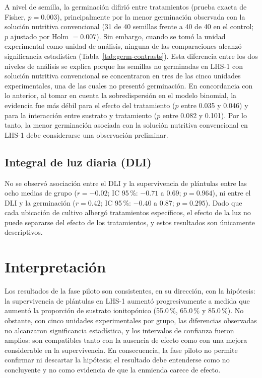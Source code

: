 \documentclass[11pt]{article}
\begin{document}
A nivel de semilla, la germinación difirió entre tratamientos (prueba exacta de Fisher, $p = 0.003$), principalmente por la menor germinación observada con la solución nutritiva convencional (31 de 40 semillas frente a 40 de 40 en el control; $p$ ajustado por Holm $= 0.007$). Sin embargo, cuando se tomó la unidad experimental como unidad de análisis, ninguna de las comparaciones alcanzó significancia estadística (Tabla~\ref{tab:germ-contrasts}). Esta diferencia entre los dos niveles de análisis se explica porque las semillas no germinadas en LHS-1 con solución nutritiva convencional se concentraron en tres de las cinco unidades experimentales, una de las cuales no presentó germinación. En concordancia con lo anterior, al tomar en cuenta la sobredispersión en el modelo binomial, la evidencia fue más débil para el efecto del tratamiento ($p$ entre 0.035 y 0.046) y para la interacción entre sustrato y tratamiento ($p$ entre 0.082 y 0.101). Por lo tanto, la menor germinación asociada con la solución nutritiva convencional en LHS-1 debe considerarse una observación preliminar.

\begin{table}[H]
\caption{\capTabH}\label{tab:germ-contrasts}
\end{table}

\subsection{Integral de luz diaria (DLI)}

No se observó asociación entre el DLI y la supervivencia de plántulas entre las ocho medias de grupo ($r = -0.02$; IC 95\,\%: $-0.71$ a 0.69; $p = 0.964$), ni entre el DLI y la germinación ($r = 0.42$; IC 95\,\%: $-0.40$ a 0.87; $p = 0.295$). Dado que cada ubicación de cultivo albergó tratamientos específicos, el efecto de la luz no puede separarse del efecto de los tratamientos, y estos resultados son únicamente descriptivos.

\section{Interpretación}

Los resultados de la fase piloto son consistentes, en su dirección, con la hipótesis: la supervivencia de plántulas en LHS-1 aumentó progresivamente a medida que aumentó la proporción de sustrato ionitopónico (55.0\,\%, 65.0\,\% y 85.0\,\%). No obstante, con cinco unidades experimentales por grupo, las diferencias observadas no alcanzaron significancia estadística, y los intervalos de confianza fueron amplios: son compatibles tanto con la ausencia de efecto como con una mejora considerable en la supervivencia. En consecuencia, la fase piloto no permite confirmar ni descartar la hipótesis; el resultado debe entenderse como no concluyente y no como evidencia de que la enmienda carece de efecto.
\end{document}
